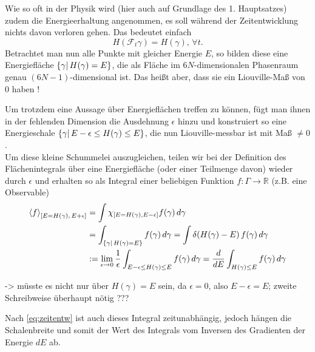 \documentclass[../KlassMech_main.tex]{subfiles}
\begin{document}
Wie so oft in der Physik wird (hier auch auf Grundlage des 1. Hauptsatzes) zudem die Energieerhaltung angenommen, es soll während der Zeitentwicklung nichts davon verloren gehen. Das bedeutet einfach
\begin{equation}\label{key}
H(\mathcal{F}_t \gamma) = H(\gamma), \, \forall t .
\end{equation}
Betrachtet man nun alle Punkte mit gleicher Energie $E$, so bilden diese eine Energiefläche $\qty{\gamma | \, H(\gamma) = E}$, die als Fläche im $6N$-dimensionalen Phasenraum genau $(6N-1)$-dimensional ist. Das heißt aber, dass sie ein Liouville-Maß von 0 haben !

Um trotzdem eine Aussage über Energieflächen treffen zu können, fügt man ihnen in der fehlenden Dimension die Ausdehnung $\epsilon$ hinzu und konstruiert so eine Energieschale $\qty{\gamma | \, E-\epsilon \leq H(\gamma) \leq E}$, die nun Liouville-messbar ist mit Maß $\neq 0$.\\
Um diese kleine Schummelei auszugleichen, teilen wir bei der Definition des Flächenintegrals über eine Energiefläche (oder einer Teilmenge davon) wieder durch $\epsilon$ und erhalten so als Integral einer beliebigen Funktion $f: \Gamma \rightarrow \mathbb{R}$ (z.B. eine Observable) 
\begin{align}\label{eq:energy}
\expval{f}_{\qty[E = H(\gamma), \, E + \epsilon]} &= \int \chi_{\qty[E = H(\gamma), E - \epsilon]} f(\gamma) \, d\gamma
\notag\\
&= \int_{\qty{\gamma | \, H(\gamma) = E}} f(\gamma) \, d\gamma = \int \delta(H(\gamma) - E) \, f(\gamma) \, d\gamma
\notag\\
&:= \lim_{\epsilon \rightarrow 0} \frac{1}{\epsilon} \int_{E-\epsilon \leq H(\gamma) \leq E} f(\gamma) \, d\gamma = \dv{E} \int_{H(\gamma) \leq E} f(\gamma) \, d\gamma
\end{align}

-> müsste es nicht nur über $H(\gamma) = E$ sein, da $\epsilon = 0$, also $E - \epsilon = E$; zweite Schreibweise überhaupt nötig ???


Nach \eqref{eq:zeitentw} ist auch dieses Integral zeitunabhängig, jedoch hängen die Schalenbreite und somit der Wert des Integrals vom Inversen des Gradienten der Energie $dE$ ab.

	\\
\end{document}
